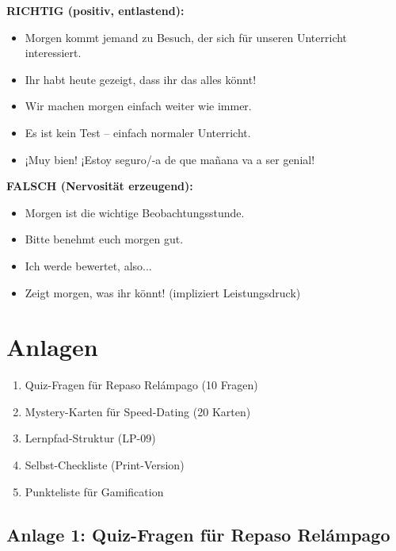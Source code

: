 \documentclass[11pt,a4paper]{article}
\begin{document}
\begin{infobox}
\textbf{RICHTIG (positiv, entlastend):}
\begin{itemize}
    \item \glqq{}Morgen kommt jemand zu Besuch, der sich für unseren Unterricht interessiert.\grqq{}
    \item \glqq{}Ihr habt heute gezeigt, dass ihr das alles könnt!\grqq{}
    \item \glqq{}Wir machen morgen einfach weiter wie immer.\grqq{}
    \item \glqq{}Es ist kein Test -- einfach normaler Unterricht.\grqq{}
    \item \glqq{}¡Muy bien! ¡Estoy seguro/-a de que mañana va a ser genial!\grqq{}
\end{itemize}

\textbf{FALSCH (Nervosität erzeugend):}
\begin{itemize}
    \item[\texttimes] \glqq{}Morgen ist die wichtige Beobachtungsstunde.\grqq{}
    \item[\texttimes] \glqq{}Bitte benehmt euch morgen gut.\grqq{}
    \item[\texttimes] \glqq{}Ich werde bewertet, also...\grqq{}
    \item[\texttimes] \glqq{}Zeigt morgen, was ihr könnt!\grqq{} (impliziert Leistungsdruck)
\end{itemize}
\end{infobox}

\section{Anlagen}

\begin{enumerate}
    \item Quiz-Fragen für Repaso Relámpago (10 Fragen)
    \item Mystery-Karten für Speed-Dating (20 Karten)
    \item Lernpfad-Struktur (LP-09)
    \item Selbst-Checkliste (Print-Version)
    \item Punkteliste für Gamification
\end{enumerate}

\subsection{Anlage 1: Quiz-Fragen für Repaso Relámpago}
\end{document}
